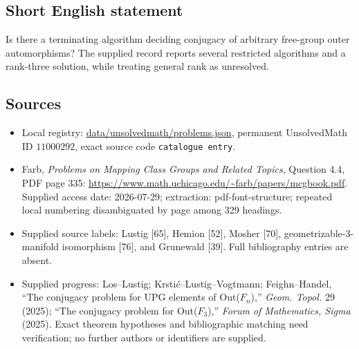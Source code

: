 \documentclass[11pt]{article}
\begin{document}
\subsection{Short English statement}
Is there a terminating algorithm deciding conjugacy of arbitrary free-group outer automorphisms? The supplied record reports several restricted algorithms and a rank-three solution, while treating general rank as unresolved.
\subsection{Sources}
\begin{itemize}
\item Local registry: \url{data/unsolvedmath/problems.json}, permanent UnsolvedMath ID $11000292$, exact source code \texttt{catalogue entry}.
\item Farb, \emph{Problems on Mapping Class Groups and Related Topics}, Question 4.4, PDF page 335: \url{https://www.math.uchicago.edu/~farb/papers/mcgbook.pdf}. Supplied access date: 2026-07-29; extraction: pdf-font-structure; repeated local numbering disambiguated by page among 329 headings.
\item Supplied source labels: Lustig [65], Hemion [52], Mosher [70], geometrizable-$3$-manifold isomorphism [76], and Grunewald [39]. Full bibliography entries are absent.
\item Supplied progress: Los--Lustig; Krsti\'c--Lustig--Vogtmann; Feighn--Handel, ``The conjugacy problem for UPG elements of Out($F_n$),'' \emph{Geom. Topol.} 29 (2025); ``The conjugacy problem for Out($F_3$),'' \emph{Forum of Mathematics, Sigma} (2025). Exact theorem hypotheses and bibliographic matching need verification; no further authors or identifiers are supplied.
\end{itemize}
\end{document}
